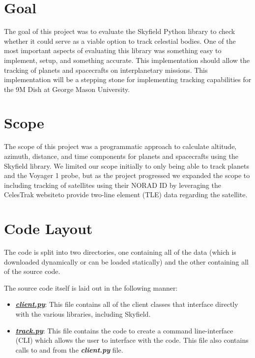 \documentclass[../main.tex]{subfiles}
\begin{document}
\section{Goal}
The goal of this project was to evaluate the Skyfield\cite{skyfield-main} Python library to check whether it could serve as a viable option to track celestial bodies. One of the most important aspects of evaluating this library was something easy to implement, setup, and something accurate. This implementation should allow the tracking of planets and spacecrafts on interplanetary missions. This implementation will be a stepping stone for implementing tracking capabilities for the 9M Dish at George Mason University.

\section{Scope}
The scope of this project was a programmatic approach to calculate altitude, azimuth, distance, and time components for planets and spacecrafts using the Skyfield\cite{skyfield-main} library. We limited our scope initially to only being able to track planets and the Voyager 1 probe, but as the project progressed we expanded the scope to including tracking of satellites using their NORAD ID by leveraging the CelesTrak website\cite{kelso}to provide two-line element (TLE) data regarding the satellite. 

\section{Code Layout}
The code is split into two directories, one containing all of the data (which is downloaded dynamically or can be loaded statically) and the other containing all of the source code. 

The source code itself is laid out in the following manner:
\begin{itemize}
    \item \textbf{\textit{\underline{client.py}}}: This file contains all of the client classes that interface directly with the various libraries, including Skyfield. 
    
    \item \textbf{\textit{\underline{track.py}}}: This file contains the code to create a command line-interface (CLI) which allows the user to interface with the code. This file also contains calls to and from the \textbf{\textit{client.py}} file. 
\end{itemize}
\end{document}
